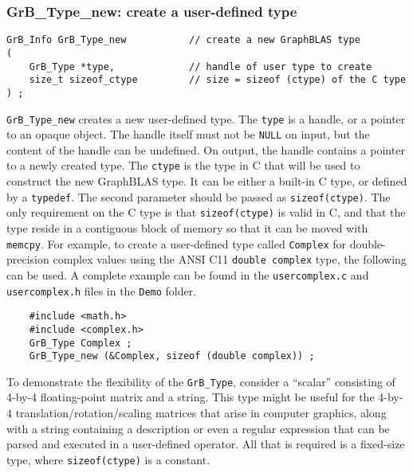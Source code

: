 \documentclass[12pt]{article}
\begin{document}
\subsubsection{{\sf GrB\_Type\_new:} create a user-defined type}
\label{type_new}

\begin{mdframed}[userdefinedwidth=6in]
{\footnotesize
\begin{verbatim}
GrB_Info GrB_Type_new           // create a new GraphBLAS type
(
    GrB_Type *type,             // handle of user type to create
    size_t sizeof_ctype         // size = sizeof (ctype) of the C type
) ;
\end{verbatim}
}\end{mdframed}

\verb'GrB_Type_new' creates a new user-defined type.  The \verb'type' is a
handle, or a pointer to an opaque object.  The handle itself must not be
\verb'NULL' on input, but the content of the handle can be undefined.  On
output, the handle contains a pointer to a newly created type.
The \verb'ctype' is the type in C that will be used to construct the new
GraphBLAS type.  It can be either a built-in C type, or defined by a
\verb'typedef'.
The second parameter should be passed as \verb'sizeof(ctype)'.  The only
requirement on the C type is that \verb'sizeof(ctype)' is valid in C, and
that the type reside in a contiguous block of memory so that it can be moved
with \verb'memcpy'.  For example, to create a user-defined type called
\verb'Complex' for double-precision complex values using the ANSI C11
\verb'double complex' type, the following can be used.  A complete example can
be found in the \verb'usercomplex.c' and \verb'usercomplex.h' files in the
\verb'Demo' folder.

    {\footnotesize
    \begin{verbatim}
    #include <math.h>
    #include <complex.h>
    GrB_Type Complex ;
    GrB_Type_new (&Complex, sizeof (double complex)) ;    \end{verbatim} }

To demonstrate the flexibility of the \verb'GrB_Type', consider a ``scalar''
consisting of 4-by-4 floating-point matrix and a string.  This type might be
useful for the 4-by-4 translation/rotation/scaling matrices that arise in
computer graphics, along with a string containing a description or even a
regular expression that can be parsed and executed in a user-defined operator.
All that is required is a fixed-size type, where \verb'sizeof(ctype)' is
a constant.
\end{document}
